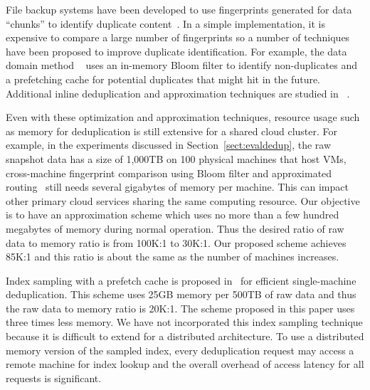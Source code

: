 File backup systems have been developed to use fingerprints generated for
data ``chunks''  to identify duplicate
content~\cite{venti02,Rhea2008}.  In a simple implementation,
it is expensive to compare a large number of 
fingerprints
so a number of techniques have been proposed to improve duplicate identification. 
For example, the data domain method ~\cite{bottleneck08} 
uses an in-memory Bloom filter to identify non-duplicates and a prefetching cache for potential
duplicates that might hit in the future.
Additional inline deduplication and  approximation techniques
are studied in ~\cite{extreme_binning09,sparseindex09,Srinivasan2012,WeiZhangIEEE}.  

Even with these optimization and approximation techniques, resource usage such as memory  for deduplication
is still extensive for a shared cloud cluster.  
For example, in the experiments discussed in Section~\ref{sect:evaldedup}, 
the raw snapshot data has a size of 1,000TB on 100 physical machines that host VMs,
cross-machine fingerprint comparison using Bloom filter and approximated routing~\cite{bottleneck08,Dong2011} 
still needs several gigabytes of memory per machine. This can impact other primary cloud services sharing the same
computing resource. Our objective is to have an approximation scheme 
which uses no more than a few hundred megabytes of memory during normal operation.
Thus the  desired ratio of raw data to memory ratio is from 100K:1 to 30K:1.
Our proposed scheme achieves 85K:1
and this ratio is about the same as the number of machines increases.

Index sampling with a prefetch cache  is proposed 
in~\cite{Guo2011} for efficient single-machine deduplication. 
This scheme uses 25GB memory per 500TB of raw data
and thus the raw data to memory ratio is 20K:1. The scheme proposed in this paper 
uses three times less memory. We have not incorporated this index 
sampling technique because it is difficult to extend 
for a distributed architecture.  To use a distributed memory version 
of the sampled index, every deduplication
request may access a remote machine for index lookup and the overall overhead 
of access latency for all requests is significant.

